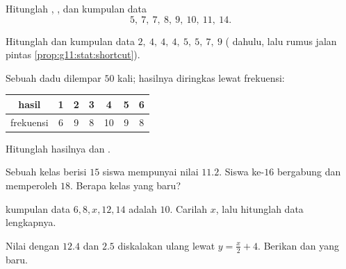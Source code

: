 \begin{exercise}[$\star$]\label{exo:g11:stat:1}
Hitunglah , ,  dan  kumpulan
data
\[
5,\ 7,\ 7,\ 8,\ 9,\ 10,\ 11,\ 14 .
\]
\end{exercise}

\begin{exercise}[$\star$]\label{exo:g11:stat:2}
Hitunglah  dan  kumpulan data
$2,\ 4,\ 4,\ 4,\ 5,\ 5,\ 7,\ 9$ ( dahulu, lalu rumus jalan pintas
\cref{prop:g11:stat:shortcut}).
\end{exercise}

\begin{exercise}[$\star$]\label{exo:g11:stat:3}
Sebuah dadu dilempar $50$ kali; hasilnya diringkas lewat frekuensi:
\begin{center}
\begin{tabular}{c|cccccc}
hasil & 1 & 2 & 3 & 4 & 5 & 6\\
\hline
frekuensi & 6 & 9 & 8 & 10 & 9 & 8
\end{tabular}
\end{center}
Hitunglah  hasilnya dan .
\end{exercise}

\begin{exercise}[$\star\star$]\label{exo:g11:stat:4}
Sebuah kelas berisi $15$ siswa mempunyai  nilai $11.2$. Siswa ke-$16$
bergabung dan memperoleh $18$. Berapa  kelas yang baru?
\end{exercise}

\begin{exercise}[$\star\star$]\label{exo:g11:stat:5}
 kumpulan data $6, 8, x, 12, 14$ adalah $10$. Carilah $x$, lalu
hitunglah  data lengkapnya.
\end{exercise}

\begin{exercise}[$\star$]\label{exo:g11:stat:6}
Nilai dengan  $12.4$ dan  $2.5$ diskalakan ulang lewat
$y = \frac{x}{2} + 4$. Berikan  dan  yang baru.
\end{exercise}

